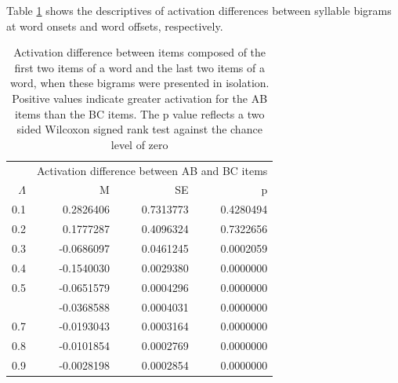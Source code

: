 \documentclass[
]{article}
\begin{document}
Table
\ref{tab:basic-experiment-global-print-difference-between-parts-of-word2}
shows the descriptives of activation differences between syllable
bigrams at word onsets and word offsets, respectively.

\begin{table}

\caption{\label{tab:basic-experiment-global-print-difference-between-parts-of-word2}Activation difference between items composed of the first two items of a word and the last two items of a word, when these bigrams were presented in isolation. Positive values indicate greater activation for the AB items than the BC items. The p value reflects a two sided Wilcoxon signed rank test against the chance level of zero}
\centering
\begin{tabular}[t]{rrrr}
\toprule
\multicolumn{1}{c}{ } & \multicolumn{3}{c}{Activation difference between AB and BC items} \\
\cmidrule(l{3pt}r{3pt}){2-4}
$\Lambda$ & M & SE & p\\
\midrule
0.1 & 0.2826406 & 0.7313773 & 0.4280494\\
0.2 & 0.1777287 & 0.4096324 & 0.7322656\\
0.3 & -0.0686097 & 0.0461245 & 0.0002059\\
0.4 & -0.1540030 & 0.0029380 & 0.0000000\\
0.5 & -0.0651579 & 0.0004296 & 0.0000000\\
\addlinespace
0.6 & -0.0368588 & 0.0004031 & 0.0000000\\
0.7 & -0.0193043 & 0.0003164 & 0.0000000\\
0.8 & -0.0101854 & 0.0002769 & 0.0000000\\
0.9 & -0.0028198 & 0.0002854 & 0.0000000\\
\bottomrule
\end{tabular}
\end{table}

  
\end{document}
